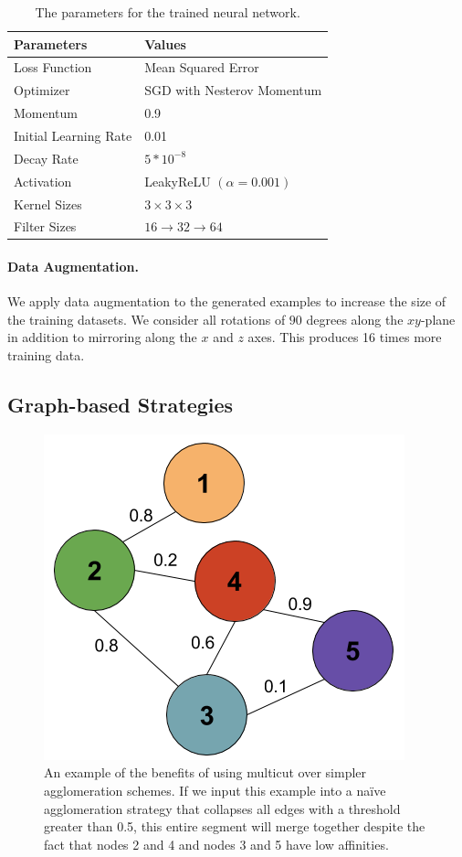 \begin{table}[h!]
	\centering
	\begin{tabular}{l l} \hline
		\textbf{Parameters} & \textbf{Values} \\ \hline
		Loss Function & Mean Squared Error \\
		Optimizer & SGD  with Nesterov Momentum \\
		Momentum & 0.9 \\
		Initial Learning Rate & 0.01 \\
		Decay Rate & $5 * 10^{-8}$ \\
		Activation & LeakyReLU $(\alpha = 0.001)$ \\
		Kernel Sizes & $3 \times 3 \times 3$ \\
		Filter Sizes & $16 \to 32 \to 64$ \\ \hline
	\end{tabular}
	\caption{The parameters for the trained neural network.}
	\label{table:architecture}
\end{table}

\paragraph{Data Augmentation.}
We apply data augmentation to the generated examples to increase the size of the training datasets. 
We consider all rotations of $90$ degrees along the $xy$-plane in addition to mirroring along the $x$ and $z$ axes. 
This produces 16 times more training data. 

\subsection{Graph-based Strategies}

\begin{figure}
	\centering
	\includegraphics[width=0.8\linewidth]{./figures/multicut.png}
	\caption{An example of the benefits of using multicut over simpler agglomeration schemes. If we input this example into a na\"ive agglomeration strategy that collapses all edges with a threshold greater than 0.5, this entire segment will merge together despite the fact that nodes 2 and 4 and nodes 3 and 5 have low affinities.}
	\label{fig:multicut}
\end{figure}

